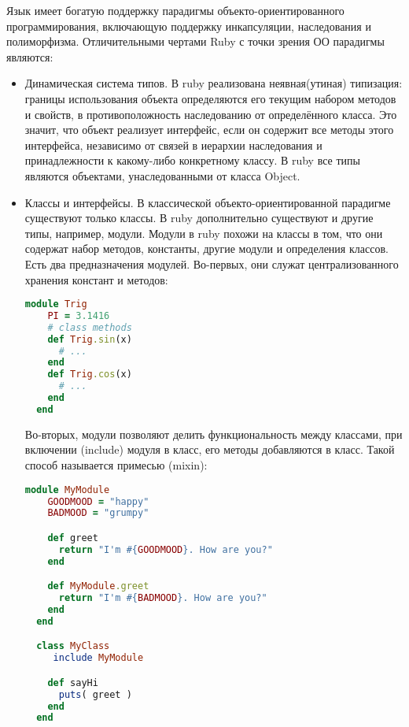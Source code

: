 Язык имеет богатую поддержку парадигмы объекто-ориентированного программирования, включающую поддержку инкапсуляции, наследования и полиморфизма.
Отличительными чертами Ruby с точки зрения ОО парадигмы являются:
\begin{itemize}
  \item Динамическая система типов.
        В ruby реализована неявная(утиная) типизация: границы использования объекта определяются его текущим набором методов и свойств, в противоположность наследованию от определённого класса. Это значит, что объект реализует интерфейс, если он содержит все методы этого интерфейса, независимо от связей в иерархии наследования и принадлежности к какому-либо конкретному классу.
        В ruby все типы являются объектами, унаследованными от класса Object.
  \item Классы и интерфейсы.
        В классической объекто-ориентированной парадигме существуют только классы.
        В ruby дополнительно существуют и другие типы, например, модули.
        Модули в ruby похожи на классы в том, что они содержат набор методов, константы, другие модули и определения классов.
        Есть два предназначения модулей. Во-первых, они служат централизованного хранения констант и методов:
        \begin{lstlisting}[language=Ruby, style=rubystyle]
  module Trig
    PI = 3.1416
    # class methods
    def Trig.sin(x)
      # ...
    end
    def Trig.cos(x)
      # ...
    end
  end
        \end{lstlisting}

        Во-вторых, модули позволяют делить функциональность между классами, при включении (include) модуля в класс, его методы добавляются в класс. Такой способ называется примесью (mixin):

        \begin{lstlisting}[language=Ruby, style=rubystyle]
  module MyModule
    GOODMOOD = "happy"
    BADMOOD = "grumpy"

    def greet
      return "I'm #{GOODMOOD}. How are you?"
    end

    def MyModule.greet
      return "I'm #{BADMOOD}. How are you?"
    end
  end

  class MyClass
     include MyModule

    def sayHi
      puts( greet )
    end
  end


\end{lstlisting}
\end{itemize}
